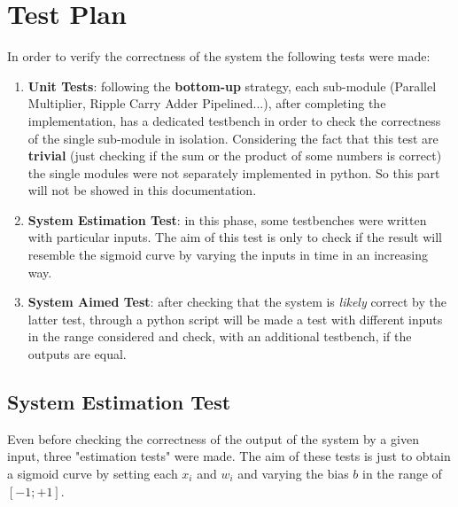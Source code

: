 \section{Test Plan}
In order to verify the correctness of the system the following tests were made:
\begin{enumerate}
	\item \textbf{Unit Tests}: following the \textbf{bottom-up} strategy, each sub-module (Parallel Multiplier, Ripple Carry Adder Pipelined...), after completing the implementation, has a dedicated testbench in order to check the correctness of the single sub-module in isolation. Considering the fact that this test are \textbf{trivial} (just checking if the sum or the product of some numbers is correct) the single modules were not separately implemented in python. So this part will not be showed in this documentation.
	\item \textbf{System Estimation Test}: in this phase, some testbenches were written with particular inputs. The aim of this test is only to check if the result will resemble the sigmoid curve by varying the inputs in time in an increasing way.
	\item \textbf{System Aimed Test}: after checking that the system is \textit{likely} correct by the latter test, through a python script will be made a test with different inputs in the range considered and check, with an additional testbench, if the outputs are equal.
\end{enumerate}
\subsection{System Estimation Test}
Even before checking the correctness of the output of the system by a given input, three "estimation tests" were made. The aim of these tests is just to obtain a sigmoid curve by setting each $x_{i}$ and $w_{i}$ and varying the bias $b$ in the range of $[-1; +1]$.
